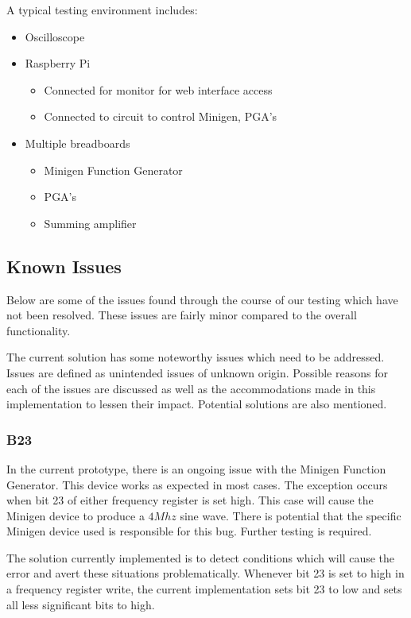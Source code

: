 \documentclass{article}	%
\begin{document}
\begin{multicols}{2}
A typical testing environment includes:
\begin{itemize}
\item Oscilloscope
\item Raspberry Pi
  \begin{itemize}
  \item Connected for monitor for web interface access
  \item Connected to circuit to control Minigen, PGA's
  \end{itemize}
\item Multiple breadboards
  \begin{itemize}
  \item Minigen Function Generator
  \item PGA's
  \item Summing amplifier
  \end{itemize}
\end{itemize}


\subsection{Known Issues}
Below are some of the issues found
through the course of our testing
which have not been resolved.
These issues are fairly minor compared
to the overall functionality.

The current solution has some noteworthy issues
which need to be addressed.
Issues are defined as unintended issues of unknown origin.
Possible reasons for each of the issues are discussed as
well as the accommodations made in this implementation to lessen their impact.
Potential solutions are also mentioned.

\subsubsection{B23}
In the current prototype,
there is an ongoing issue with the Minigen Function Generator.
This device works as expected in most cases.
The exception occurs when bit 23 of either frequency register
is set high.
This case will cause the Minigen device to produce a $4Mhz$ sine wave.
There is potential that the specific Minigen device used 
is responsible for this bug.
Further testing is required.

The solution currently implemented is
to detect conditions which will cause the error
and avert these situations problematically.
Whenever bit 23 is set to high in a frequency register write,
the current implementation sets bit 23 to low
and sets all less significant bits to high.


\end{multicols}
\end{document}
